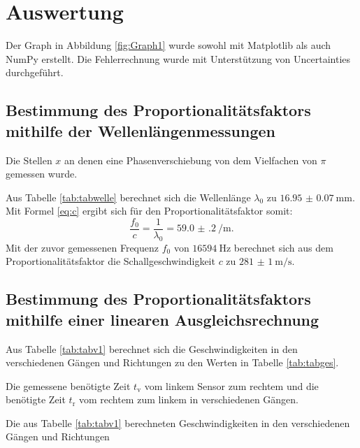 \section{Auswertung}
\label{sec:Auswertung}

Der Graph in Abbildung \ref{fig:Graph1} wurde sowohl mit Matplotlib \cite{matplotlib} als auch NumPy \cite{numpy} erstellt. Die Fehlerrechnung wurde mit Unterstützung von Uncertainties \cite{uncertainties} durchgeführt.

\subsection{Bestimmung des Proportionalitätsfaktors mithilfe der Wellenlängenmessungen}
\begin{table}
	\centering
	\caption{Die Stellen $x$ an denen eine Phasenverschiebung von dem Vielfachen von $\pi$ gemessen wurde.}
	
\end{table}
Aus Tabelle \ref{tab:tabwelle} berechnet sich die Wellenlänge $\lambda_0$ zu $\SI{16.95(7)}{\milli\meter}$. Mit Formel \eqref{eq:c} ergibt sich für den Proportionalitätsfaktor somit:
\begin{displaymath}
	\frac{f_0}{c} = \frac{1}{\lambda_0} = \SI{59.0(2)}{\per\meter}\text{.}
\end{displaymath}
Mit der zuvor gemessenen Frequenz $f_0$ von $\SI{16594}{\hertz}$ berechnet sich aus dem Proportionalitätsfaktor die Schallgeschwindigkeit $c$ zu $\SI{281(1)}{\meter\per\second}$.

\subsection{Bestimmung des Proportionalitätsfaktors  mithilfe einer linearen Ausgleichsrechnung}
Aus Tabelle \ref{tab:tabv1} berechnet sich die Geschwindigkeiten in den verschiedenen Gängen und Richtungen zu den Werten in Tabelle \ref{tab:tabges}.
\begin{table}
	\caption{Die gemessene benötigte Zeit $t_\text{v}$ vom linkem Sensor zum rechtem und die benötigte Zeit $t_\text{r}$ vom rechtem zum linkem in verschiedenen Gängen.}
	\begin{minipage}{0.5\textwidth}
		\centering
		
	\end{minipage}
	\begin{minipage}{0.5\textwidth}
		\centering
		
	\end{minipage}
\end{table}
\begin{table}
	\centering
	\caption{Die aus Tabelle \ref{tab:tabv1} berechneten Geschwindigkeiten in den verschiedenen Gängen und Richtungen}
	
\end{table}

